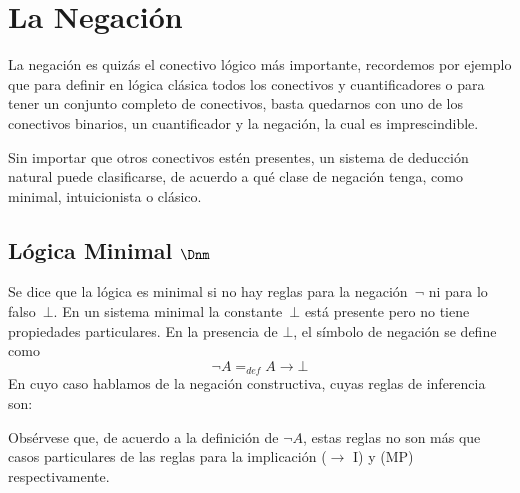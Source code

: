 \documentclass[11pt,letterpaper]{article}
\begin{document}
\section{La Negación}

La negación es quizás el conectivo lógico más importante, recordemos
por ejemplo que para definir en lógica clásica todos los conectivos y
cuantificadores o para tener un conjunto completo de conectivos, basta 
quedarnos con uno de los conectivos binarios, un cuantificador y la negación, 
la cual es imprescindible. 

Sin importar que otros conectivos estén presentes, un sistema de deducción
natural puede clasificarse, de acuerdo a qué clase de negación tenga,
como minimal, intuicionista o clásico.



\subsection{Lógica Minimal $\Dnm$}

Se dice que la lógica es minimal si no hay reglas para la negación~$\neg$ ni 
para lo falso~$\bot$. En un sistema minimal la constante~$\bot$ está presente 
pero no tiene propiedades particulares. 
En la presencia de $\bot$, el símbolo de negación se define como
$$ \neg A =_{def} A\to\bot $$
En cuyo caso hablamos de la negación constructiva, cuyas reglas de
inferencia son:
\begin{mathpar}

\end{mathpar}
Obsérvese que, de acuerdo a la definición de $\neg A$,  estas reglas
no son más que casos particulares de las reglas para la implicación
\textsc{($\to$ I)} y \textsc{(MP)} respectivamente.
\end{document}
